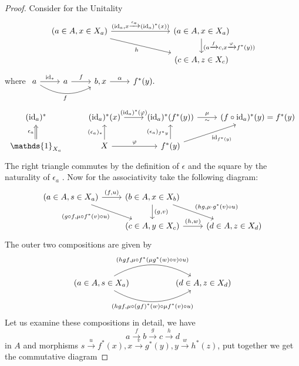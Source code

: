 \begin{proof}
	Consider for the Unitality
	\[
	\begin{tikzcd}
		( a \in A , x \in X_a )
		\ar[rrr, " { ( \id_a , x \xrightarrow{ \epsilon_a } ( \id_a )^* ( x ) ) } " ]
		\ar[rrrd, " h "' ]
		&&&
		( a \in A , x \in X_a )
		\ar[d, " { ( a \xrightarrow{ f } c , x \xrightarrow{ \varphi } f^* ( y ) ) } " ]
		\\
		&&&
		( c \in A , z \in X_c )
	\end{tikzcd}
	\]
	where
	$
	\begin{tikzcd}		
		a
		\ar[r, " \id_* "]
		\ar[rr, bend right, " f "' ]
		&
		a
		\ar[r, " f " ]
		&
		b , x
		\ar[r, " \alpha " ]
		&
		f^* ( y ).
	\end{tikzcd} 
	$
	\[
	\begin{tikzcd}
		( \id_a )^*
		&
		( \id_a )^* ( x )
		\ar[r , " ( \id_a )^* ( \varphi ) "]
		&
		( \id_a )^* ( f^* ( y ) )
		\ar[r, " \mu " , " \sim "']
		&
		( f \circ \id_a )^* ( y ) = f^* ( y )
		\\
		\mathds{ 1 }_{ X_a }
		\ar[ u , Rightarrow, " \epsilon_a " ]
		&
		X
		\ar[u, " ( \epsilon_a )_* "]
		\ar[r, " \varphi " ]
		&
		f^* ( y ) 
		\ar[u, " { ( \epsilon_a )_{ f^* y } } " ]
		\ar[ru, " \id_{ f^* ( y ) } "' ]
	\end{tikzcd}
	\]
	The right triangle commutes by the definition of $ \epsilon $ and the square by the naturality of $ \epsilon_a $ .
	Now for the associativity take the following diagram:
	\[
	\begin{tikzcd}	
		( a \in A , s \in X_a ) 
		\ar[r, " { ( f , u ) } " ]
		\ar[rd, " { ( g \circ f , \mu \circ f^* ( v ) \circ u ) } "' ]
		&
		( b \in A , x \in X_b )
		\ar[d, " {  ( g , v ) } "]
		\ar[rd, " { (  h g , \mu \cdot g^* ( v ) \circ u ) } " ]
		\\
		&
		( c \in A , y \in X_c )
		\ar[r , " { ( h , w ) } "]
		&
		( d \in A , z \in X_d )
	\end{tikzcd}
	\]
	The outer two compositions are given by
	\[
	\begin{tikzcd}		
		( a \in A , s \in X_a )
		\ar[rr, bend left, "{ ( hgf , \mu \circ f^* ( \mu g^* ( w ) \circ v ) \circ u )}"]
		\ar[rr, bend right, "{ ( hgf, \mu \circ ( gf )^* ( w ) \circ \mu f^* ( v ) \circ u ) } "']
		&&
		( d \in A , z \in X_d )
	\end{tikzcd}
	\]
	Let us examine these compositions in detail, we have
	\[
		a \xrightarrow{f} b \xrightarrow{g} c \xrightarrow{h} d
	\]
	in $ A $
	and morphisms $ s \xrightarrow{u} f^* ( x ) , x \xrightarrow{v} g^* ( y ) , y \xrightarrow{w} h^* ( z ) $, put together we get the commutative diagram

\end{proof}
